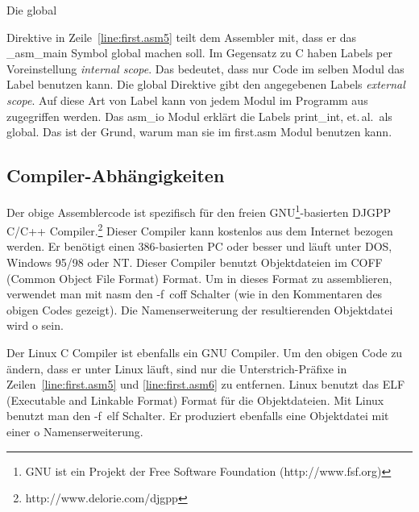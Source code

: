 Die {\code global} { Direktive in
Zeile~\ref{line:first.asm5} teilt dem Assembler mit, dass er das
{\code \_asm\_main} Symbol global machen soll. Im Gegensatz zu C
haben Labels per Voreinstellung \emph{internal scope}. Das bedeutet,
dass nur Code im selben Modul das Label benutzen kann. Die {\code
global} Direktive gibt den angegebenen Labels \emph{external scope}.
Auf diese Art von Label kann von jedem Modul im Programm aus
zugegriffen werden. Das {\code asm\_io} Modul erkl\"{a}rt die Labels
{\code print\_int}, et.\,al.\ als global. Das ist der Grund, warum
man sie im {\code first.asm} Modul benutzen kann.

\subsection{Compiler-Abh\"{a}ngigkeiten}

Der obige Assemblercode ist spezifisch f\"{u}r den freien
GNU\footnote{GNU ist ein Projekt der Free Software Foundation
({\code http://www.fsf.org})}-basierten DJGPP 
C/C++ Compiler.\footnote{\code http://www.delorie.com/djgpp} Dieser
Compiler kann kostenlos aus dem Internet bezogen werden. Er ben\"{o}tigt
einen 386-basierten PC oder besser und l\"{a}uft unter DOS, Windows
95/98 oder NT\@. Dieser Compiler benutzt Objektdateien im COFF
(Common Object File Format) Format. Um in dieses Format zu
assemblieren, verwendet man mit {\code nasm} 
den {\code -f~coff} Schalter (wie in den Kommentaren des obigen
Codes gezeigt). Die Namenserweiterung der resultierenden Objektdatei
wird {\code o} sein.

Der Linux C Compiler ist ebenfalls ein GNU Compiler.
 Um den obigen Code zu \"{a}ndern, dass er unter
Linux l\"{a}uft, sind nur die Unterstrich-Pr\"{a}fixe in
Zeilen~\ref{line:first.asm5} und \ref{line:first.asm6} zu entfernen.
Linux benutzt das ELF (Executable and Linkable Format) Format f\"{u}r
die Objektdateien. Mit Linux benutzt man den {\code -f~elf}
Schalter. Er produziert ebenfalls eine Objektdatei mit einer {\code
o} Namenserweiterung.

}

